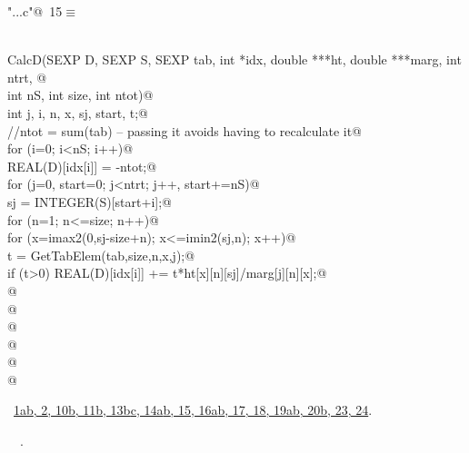 \documentclass[reqno]{amsart}
\renewcommand{\NWtarget}[2]{\hypertarget{#1}{#2}}
\renewcommand{\NWlink}[2]{\hyperlink{#1}{#2}}
\begin{document}
\begin{flushleft} \small\label{scrap25}\raggedright\small
\NWtarget{nuweb15}{} \verb@"..\src\ReprodCalcs.c"@\nobreak\ {\footnotesize {15}}$\equiv$
\vspace{-1ex}
\begin{list}{}{} \item
\mbox{}\verb@@\\
\mbox{}\verb@void CalcD(SEXP D, SEXP S, SEXP tab, int *idx, double ***ht, double ***marg, int ntrt, @\\
\mbox{}\verb@           int nS, int size, int ntot){@\\
\mbox{}\verb@   int j, i, n, x, sj, start, t;@\\
\mbox{}\verb@         //ntot = sum(tab) -- passing it avoids having to recalculate it@\\
\mbox{}\verb@         for (i=0; i<nS; i++){@\\
\mbox{}\verb@                 REAL(D)[idx[i]] = -ntot;@\\
\mbox{}\verb@                 for (j=0, start=0; j<ntrt; j++, start+=nS){@\\
\mbox{}\verb@                         sj = INTEGER(S)[start+i];@\\
\mbox{}\verb@                         for (n=1; n<=size; n++){@\\
\mbox{}\verb@                                 for (x=imax2(0,sj-size+n); x<=imin2(sj,n); x++){@\\
\mbox{}\verb@                                         t = GetTabElem(tab,size,n,x,j);@\\
\mbox{}\verb@                                         if (t>0) REAL(D)[idx[i]] += t*ht[x][n][sj]/marg[j][n][x];@\\
\mbox{}\verb@                                 }@\\
\mbox{}\verb@                         }@\\
\mbox{}\verb@                 }@\\
\mbox{}\verb@         }@\\
\mbox{}\verb@         @\\
\mbox{}\verb@ }@\\
\mbox{}\verb@@{\NWsep}
\end{list}
\vspace{-1.5ex}
\footnotesize
\begin{list}{}{\setlength{\itemsep}{-\parsep}\setlength{\itemindent}{-\leftmargin}}
\item \NWtxtFileDefBy\ \NWlink{nuweb1a}{1a}\NWlink{nuweb1b}{b}\NWlink{nuweb2}{, 2}\NWlink{nuweb10b}{, 10b}\NWlink{nuweb11b}{, 11b}\NWlink{nuweb13b}{, 13b}\NWlink{nuweb13c}{c}\NWlink{nuweb14a}{, 14a}\NWlink{nuweb14b}{b}\NWlink{nuweb15}{, 15}\NWlink{nuweb16a}{, 16a}\NWlink{nuweb16b}{b}\NWlink{nuweb17}{, 17}\NWlink{nuweb18}{, 18}\NWlink{nuweb19a}{, 19a}\NWlink{nuweb19b}{b}\NWlink{nuweb20b}{, 20b}\NWlink{nuweb23}{, 23}\NWlink{nuweb24}{, 24}.
\item \NWtxtIdentsDefed\nobreak\  \verb@calcD@\nobreak\ \NWtxtIdentsNotUsed.
\item{}
\end{list}
\vspace{4ex}
\end{flushleft}
\end{document}
